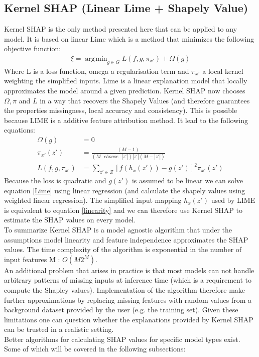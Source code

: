 \documentclass[conference]{IEEEtran}
\DeclareMathOperator*{\argmin}{\arg\!\min}
\begin{document}
\subsection{Kernel SHAP (Linear Lime + Shapely Value)}
Kernel SHAP \cite{b2} is the only method presented here that can be applied to any model.
It is based on linear Lime which is a method that minimizes the following objective function:
\begin{align}
\xi = \argmin_{g \in G} L(f,g,\pi_{x'}) + \Omega(g) \label{Lime}
\end{align}
Where L is a loss function, omega a regularisation term and $\pi_{x'}$ a local kernel weighting the simplified inputs.
Lime is a linear explanation model that locally approximates the model around a given prediction.
Kernel SHAP now chooses $\Omega, \pi$ and $L$ in a way that recovers the Shapely Values (and therefore guarantees the properties missingness, local accuracy and consistency). This is possible because LIME is a additive feature attribution method. It lead to the following equations:
\begin{align}
\Omega(g) &= 0\\
\pi_{x'}(z') &= \frac{(M - 1)}{(M \text{ } choose \text{ } |z'|)|z'|(M - |z'|)}\\
L(f,g,\pi_{x'}) &= \sum_{z' \in Z}[f(h_x(z')) - g(z')]^2 \pi_{x'}(z')
\end{align}
Because the loss is quadratic and $g(z')$ is assumed to be linear we can solve equation \ref{Lime} using linear regression (and calculate the shapely values using weighted linear regression). 
The simplified input mapping $h_x(z')$ used by LIME is equivalent to equation \ref{linearity} and we can therefore use Kernel SHAP to estimate the SHAP values on every model.\\
To summarize Kernel SHAP is a model agnostic algorithm that under the assumptions model linearity and feature independence approximates the SHAP values. The time complexity of the algorithm is exponential in the number of input features M : $O(M2^M)$\cite{b2}.\\
An additional problem that arises in practice is that most models can not handle arbitrary patterns of missing inputs at inference time (which is a requirement to compute the Shapley values).
Implementation of the algorithm therefore make further approximations by replacing missing features with random values from a background dataset provided by the user (e.g. the training set). 
Given these limitations one can question whether the explanations provided by Kernel SHAP can be trusted in a realistic setting.\\
Better algorithms for calculating SHAP values for specific model types exist. 
Some of which will be covered in the following subsections:\\
\end{document}
